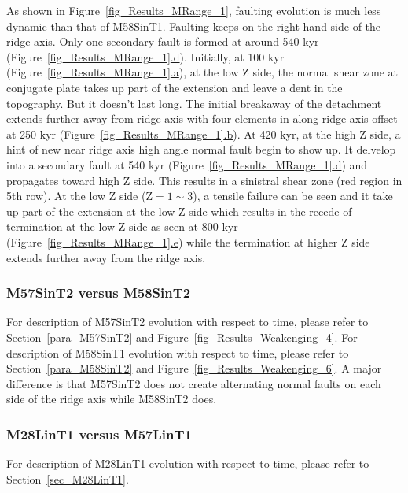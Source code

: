 As shown in Figure~\hyperref[fig_Results_MRange_1]{\ref{fig_Results_MRange_1}}, faulting evolution is much less dynamic than that of M58SinT1. Faulting keeps on the right hand side of the ridge axis. Only one secondary fault is formed at around 540 kyr (Figure~\hyperref[fig_Results_MRange_1]{\ref{fig_Results_MRange_1}.d}). Initially, at 100 kyr (Figure~\hyperref[fig_Results_MRange_1]{\ref{fig_Results_MRange_1}.a}), at the low Z side, the normal shear zone at conjugate plate takes up part of the extension and leave a dent in the topography. But it doesn't last long. The initial breakaway of the detachment extends further away from ridge axis with four elements in along ridge axis offset at 250 kyr (Figure~\hyperref[fig_Results_MRange_1]{\ref{fig_Results_MRange_1}.b}). At 420 kyr, at the high Z side, a hint of new near ridge axis high angle normal fault begin to show up. It delvelop into a secondary fault at 540 kyr (Figure~\hyperref[fig_Results_MRange_1]{\ref{fig_Results_MRange_1}.d}) and propagates toward high Z side. This results in a sinistral shear zone (red region in 5th row). At the low Z side (Z$=1\sim3$), a tensile failure can be seen and it take up part of the extension at the low Z side which results in the recede of termination at the low Z side as seen at 800 kyr (Figure~\hyperref[fig_Results_MRange_1]{\ref{fig_Results_MRange_1}.e}) while the termination at higher Z side extends further away from the ridge axis.

\subsubsection{M57SinT2 versus M58SinT2}
For description of M57SinT2 evolution with respect to time, please refer to Section~\hyperref[para_M57SinT2]{\ref{para_M57SinT2}} and Figure~\hyperref[fig_Results_Weakenging_4]{\ref{fig_Results_Weakenging_4}}. For description of M58SinT1 evolution with respect to time, please refer to  Section~\hyperref[para_M58SinT2]{\ref{para_M58SinT2}} and Figure~\hyperref[fig_Results_Weakenging_6]{\ref{fig_Results_Weakenging_6}}. A major difference is that M57SinT2 does not create alternating normal faults on each side of the ridge axis while M58SinT2 does. 

\subsubsection{M28LinT1 versus M57LinT1}
For description of M28LinT1 evolution with respect to time, please refer to Section~\hyperref[sec_M28LinT1]{\ref{sec_M28LinT1}}.
